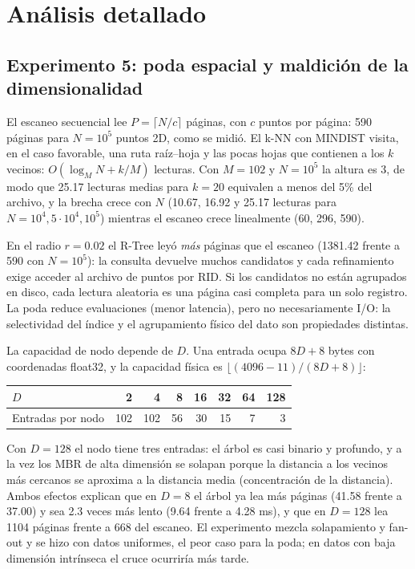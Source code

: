 \documentclass[11pt,a4paper]{article}
\begin{document}
\clearpage
\section{Análisis detallado}\label{sec:teoria}

\subsection{Experimento 5: poda espacial y maldición de la dimensionalidad}
El escaneo secuencial lee $P=\lceil N/c\rceil$ páginas, con $c$ puntos por página: 590 páginas para $N=10^5$ puntos 2D, como se midió. El k-NN con MINDIST visita, en el caso favorable, una ruta raíz--hoja y las pocas hojas que contienen a los $k$ vecinos: $O(\log_M N + k/M)$ lecturas. Con $M=102$ y $N=10^5$ la altura es 3, de modo que 25.17 lecturas medias para $k=20$ equivalen a menos del 5\% del archivo, y la brecha crece con $N$ (10.67, 16.92 y 25.17 lecturas para $N=10^4,5\cdot10^4,10^5$) mientras el escaneo crece linealmente (60, 296, 590).

En el radio $r=0.02$ el R-Tree leyó \emph{más} páginas que el escaneo (1381.42 frente a 590 con $N=10^5$): la consulta devuelve muchos candidatos y cada refinamiento exige acceder al archivo de puntos por RID. Si los candidatos no están agrupados en disco, cada lectura aleatoria es una página casi completa para un solo registro. La poda reduce evaluaciones (menor latencia), pero no necesariamente I/O: la selectividad del índice y el agrupamiento físico del dato son propiedades distintas.

La capacidad de nodo depende de $D$. Una entrada ocupa $8D+8$ bytes con coordenadas float32, y la capacidad física es $\lfloor(4096-11)/(8D+8)\rfloor$:
\begin{center}\small\begin{tabular}{@{}lrrrrrrr@{}}\toprule
$D$ & 2 & 4 & 8 & 16 & 32 & 64 & 128\\\midrule
Entradas por nodo & 102 & 102 & 56 & 30 & 15 & 7 & 3\\\bottomrule\end{tabular}\end{center}
Con $D=128$ el nodo tiene tres entradas: el árbol es casi binario y profundo, y a la vez los MBR de alta dimensión se solapan porque la distancia a los vecinos más cercanos se aproxima a la distancia media (concentración de la distancia). Ambos efectos explican que en $D=8$ el árbol ya lea más páginas (41.58 frente a 37.00) y sea 2.3 veces más lento (9.64 frente a 4.28 ms), y que en $D=128$ lea 1104 páginas frente a 668 del escaneo. El experimento mezcla solapamiento y fan-out y se hizo con datos uniformes, el peor caso para la poda; en datos con baja dimensión intrínseca el cruce ocurriría más tarde.
\end{document}
